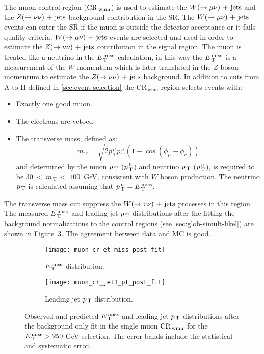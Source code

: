 The muon control region ($\mathrm{CR}_\mathrm{\, wmn}$) is used to estimate the $W (\rightarrow \mu \nu)\mathrm{~+~jets}$ and
the $Z (\rightarrow \nu \bar{\nu})\mathrm{~+~jets}$ background contribution in the SR\@. The $W (\rightarrow \mu \nu)\mathrm{~+~jets}$
events can enter the SR if the muon is outside the detector acceptance or it
fails quality criteria. $W (\rightarrow \mu \nu)\mathrm{~+~jets}$ events are selected and used in order
to estimate the $Z (\rightarrow \nu \bar{\nu})\mathrm{~+~jets}$ contribution in the signal region. The muon is
treated like a neutrino in the $E_\mathrm{\, T}^\mathrm{\, miss}$ calculation, in this way the $E_\mathrm{\, T}^\mathrm{\, miss}$ is a
measurement of the $W$ momentum which is later translated in the $Z$ boson
momentum to estimate the $Z (\rightarrow \nu \bar{\nu})\mathrm{~+~jets}$ background. In addition to cuts from A
to H defined in \cref{sec:event-selection} the CR$_{\mathrm{\, wmn}}$ region
selects events with:
\begin{itemize}
\item Exactly one good muon.
\item The electrons are vetoed.
\item The transverse mass, defined as:
  \begin{equation}
    \label{eq:99}
    m_\mathrm{\, T} = \sqrt{2 p_\mathrm{\, T}^{\, \mu} p_\mathrm{\, T}^{\, \nu}
      (1 - \cos(\phi_\mu - \phi_\nu))}
  \end{equation}
  and determined by the muon $p_\mathrm{\, T}$ ($p_\mathrm{\, T}^{\, \mu}$) and neutrino $p_\mathrm{\, T}$
  ($p_\mathrm{\, T}^{\, \nu}$), is required to be $30~<~m_\mathrm{\, T}~<~100$~GeV,
  consistent with $W$ boson production. The neutrino $p_\mathrm{\, T}$ is calculated
  assuming that $p_\mathrm{\, T}^{\, \nu} = E_\mathrm{\, T}^\mathrm{\, miss}$.
\end{itemize}
The transverse mass cut suppress the $W (\rightarrow \tau \nu)\mathrm{~+~jets}$ processes in this
region. The measured $E_\mathrm{\, T}^\mathrm{\, miss}$ and leading jet $p_\mathrm{\, T}$ distributions after the
fitting the background normalizations to the control regions (see
\cref{sec:glob-simult-likel}) are shown in Figure~\ref{fig:muon_cr_plots}. The
agreement between data and MC is good.
\begin{figure}[!h]
  \centering
  \begin{subfigure}[t]{.48\linewidth}
    \texttt{[image: muon\_cr\_et\_miss\_post\_fit]}
    \caption{$E_\mathrm{\, T}^\mathrm{\, miss}$ distribution.}
    \label{fig:muon_cr_et_miss_pre_fit}
  \end{subfigure}
  \begin{subfigure}[t]{.48\linewidth}
    \texttt{[image: muon\_cr\_jet1\_pt\_post\_fit]}
    \caption{Leading jet $p_\mathrm{\, T}$ distribution.}
    \label{fig:muon_cr_jet1_pt_pre_fit}
  \end{subfigure}
  \caption{Observed and predicted $E_\mathrm{\, T}^\mathrm{\, miss}$ and leading jet $p_\mathrm{\, T}$ distributions
    after the background only fit in the single muon $\mathrm{CR}_\mathrm{\, wmn}$ for the
    $E_\mathrm{\, T}^\mathrm{\, miss} > 250~$GeV selection. The error bands include the statistical and
    systematic error.}
  \label{fig:muon_cr_plots}
\end{figure}
